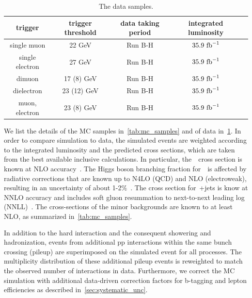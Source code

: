 \begin{table}[h!]
\begin{center}
\begin{tabular}{c|cccc}
\hline
trigger & trigger threshold & data taking period & integrated luminosity \\
\hline
single muon & 22 GeV & Run B-H &~$35.9~\mathrm{fb}^{-1}$~\\
single electron & 27 GeV & Run B-H &~$35.9~\mathrm{fb}^{-1}$~\\
dimuon & 17 (8) GeV & Run B-H &~$35.9~\mathrm{fb}^{-1}$~\\
dielectron & 23 (12) GeV & Run B-H &~$35.9~\mathrm{fb}^{-1}$~\\
muon, electron & 23 (8) GeV & Run B-H &~$35.9~\mathrm{fb}^{-1}$~\\
\hline
\hline
\end{tabular}
\caption[The data samples used in the~\ttHbb\xspace  analysis]{The data samples.}
\label{tab:data_samples}
\end{center}
\end{table}

We list the details of the MC samples in~\cref{tab:mc_samples} and of data in~\cref{tab:data_samples}. In order to compare simulation to data, the simulated events are weighted according to the integrated luminosity and the predicted cross sections, which are taken from the best available inclusive calculations. In particular, the~\ttH~cross section is known at NLO accuracy~\cite{Dittmaier:1318996,Beenakker:2001rj,Beenakker:2002nc,Dawson:2002tg,Dawson:2003zu}. The Higgs boson branching fraction for~\Hbb~is affected by radiative corrections that are known up to N4LO (QCD) and NLO (electroweak), resulting in an uncertainty of about 1-2\%~\cite{Djouadi:1997yw,Butterworth:2010ym,deFlorian:2016spz}.
The cross section for~\ttbar+jets is know at NNLO accuracy and includes soft gluon resummation to next-to-next leading log (NNLL)~\cite{Czakon:2011xx}. The cross-sections of the minor backgrounds are known to at least NLO, as summarized in~\cref{tab:mc_samples}.

In addition to the hard interaction and the consequent showering and hadronization, events from additional pp interactions within the same bunch crossing (pileup) are superimposed on the simulated event for all processes. The multiplicity distribution of these additional pileup events is reweighted to match the observed number of interactions in data. Furthermore, we correct the MC simulation with additional data-driven correction factors for b-tagging and lepton efficiencies as described in~\cref{sec:systematic_unc}.

